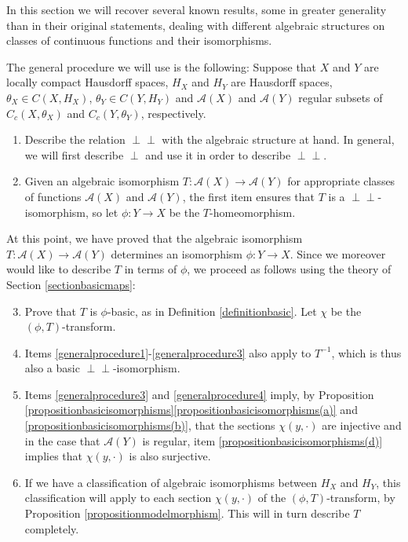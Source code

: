 \documentclass[letter,11pt]{amsart}
\theoremstyle{plain}		\newtheorem{theorem}[generalnumbering]{Theorem}
\theoremstyle{plain}		\newtheorem{corollary}[generalnumbering]{Corollary}
\theoremstyle{definition}		\newtheorem{definition}[generalnumbering]{Definition}
\theoremstyle{definition}		\newtheorem{example}[generalnumbering]{Example}
\theoremstyle{plain}		\newtheorem{proposition}[generalnumbering]{Proposition}
\theoremstyle{plain}		\newtheorem{lemma}[generalnumbering]{Lemma}
\theoremstyle{plain}    \newtheorem{plainstyle}[generalnumbering]{\namefordifferentenvironment}
\theoremstyle{plain}    \newtheorem*{plainstyle*}{\namefordifferentenvironment}
\theoremstyle{definition}    \newtheorem{definitionstyle}[generalnumbering]{\namefordifferentenvironment}
\theoremstyle{definition}    \newtheorem*{definitionstyle*}{\namefordifferentenvironment}
\newcommand{\perpp}{\perp\!\!\!\perp}
\begin{document}
In this section we will recover several known results, some in greater generality than in their original statements, dealing with different algebraic structures on classes of continuous functions and their isomorphisms.

The general procedure we will use is the following: Suppose that $X$ and $Y$ are locally compact Hausdorff spaces, $H_X$ and $H_Y$ are Hausdorff spaces, $\theta_X\in C(X,H_X)$, $\theta_Y\in C(Y,H_Y)$ and $\mathcal{A}(X)$ and $\mathcal{A}(Y)$ regular subsets of $C_c(X,\theta_X)$ and $C_c(Y,\theta_Y)$, respectively.
\begin{enumerate}[label=\arabic*.]
	\item\label{generalprocedure1} Describe the relation $\perpp$ with the algebraic structure at hand. In general, we will first describe $\perp$ and use it in order to describe $\perpp$.
	\item\label{generalprocedure2} Given an algebraic isomorphism $T\colon\mathcal{A}(X)\to\mathcal{A}(Y)$ for appropriate classes of functions $\mathcal{A}(X)$ and $\mathcal{A}(Y)$, the first item ensures that $T$ is a $\perpp$-isomorphism, so let $\phi\colon Y\to X$ be the $T$-homeomorphism.
\end{enumerate}
At this point, we have proved that the algebraic isomorphism $T\colon\mathcal{A}(X)\to\mathcal{A}(Y)$ determines an isomorphism $\phi\colon Y\to X$. Since we moreover would like to describe $T$ in terms of $\phi$, we proceed as follows using the theory of Section \ref{sectionbasicmaps}:
\begin{enumerate}[label=\arabic*.]\setcounter{enumi}{2}
	\item\label{generalprocedure3} Prove that $T$ is $\phi$-basic, as in Definition \ref{definitionbasic}. Let $\chi$ be the $(\phi,T)$-transform.
	\item\label{generalprocedure4} Items \ref{generalprocedure1}-\ref{generalprocedure3} also apply to $T^{-1}$, which is thus also a basic $\perpp$-isomorphism.
	\item\label{generalprocedure5} Items \ref{generalprocedure3} and \ref{generalprocedure4}  imply, by Proposition \ref{propositionbasicisomorphisms}\ref{propositionbasicisomorphisms(a)} and \ref{propositionbasicisomorphisms(b)}, that the sections $\chi(y,\cdot)$ are injective and in the case that $\mathcal{A}(Y)$ is regular, item \ref{propositionbasicisomorphisms(d)} implies that $\chi(y,\cdot)$ is also surjective.
	\item\label{generalprocedure6} If we have a classification of algebraic isomorphisms between $H_X$ and $H_Y$, this classification will apply to each section $\chi(y,\cdot)$ of the $(\phi,T)$-transform, by Proposition \ref{propositionmodelmorphism}. This will in turn describe $T$ completely.
\end{enumerate}
\end{document}
